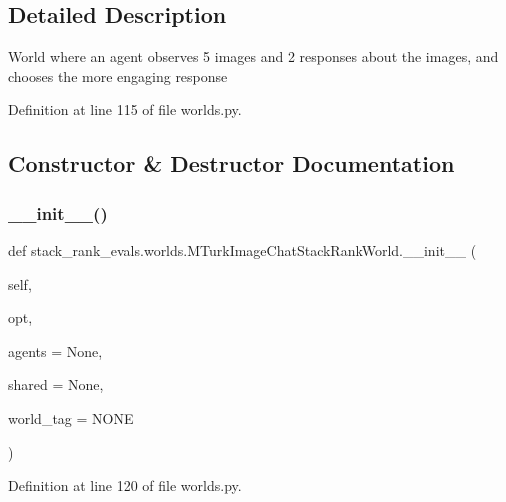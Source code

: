 \subsection{Detailed Description}
\begin{DoxyVerb}World where an agent observes 5 images and 2 responses about the images,
   and chooses the more engaging response
\end{DoxyVerb}
 

Definition at line 115 of file worlds.\+py.



\subsection{Constructor \& Destructor Documentation}
\mbox{\label{classstack__rank__evals_1_1worlds_1_1MTurkImageChatStackRankWorld_aee5ebf396ed850b0121c2bfb3cb871d3}} 
\subsubsection{\texorpdfstring{\+\_\+\+\_\+init\+\_\+\+\_\+()}{\_\_init\_\_()}}
{\footnotesize\ttfamily def stack\+\_\+rank\+\_\+evals.\+worlds.\+M\+Turk\+Image\+Chat\+Stack\+Rank\+World.\+\_\+\+\_\+init\+\_\+\+\_\+ (\begin{DoxyParamCaption}\item[{}]{self,  }\item[{}]{opt,  }\item[{}]{agents = {\ttfamily None},  }\item[{}]{shared = {\ttfamily None},  }\item[{}]{world\+\_\+tag = {\ttfamily \textquotesingle{}NONE\textquotesingle{}} }\end{DoxyParamCaption})}



Definition at line 120 of file worlds.\+py.




